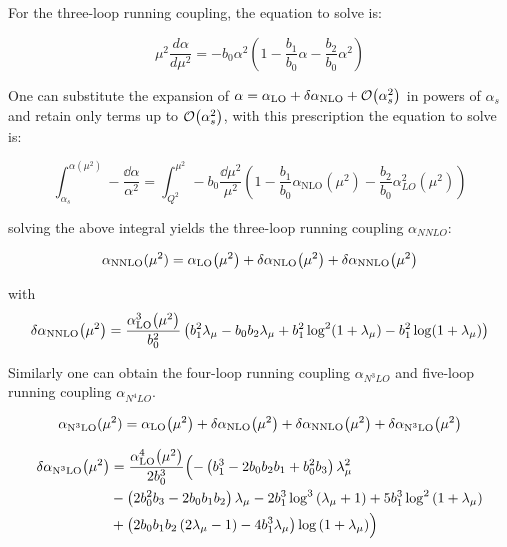 \documentclass[../main.tex]{subfiles}
\begin{document}
For the three-loop running coupling, the equation to solve is:

\begin{equation}
    \mu^2 \frac{d\alpha}{d\mu^2} = - b_0 \alpha^2(1 - \frac{b_1}{b_0} \alpha - \frac{b_2}{b_0} \alpha^2)
\end{equation}

One can substitute the expansion of $\alpha= \alpha_{\text{LO}}+\delta\alpha_{\text{NLO}}+\order{\alpha_s^2}$ in powers of $\alpha_s$ 
and retain only terms up to $\order{\alpha_s^2}$, with this prescription the equation to solve is:

\begin{equation}
    \int_{\alpha_s}^{\alpha(\mu^2)} -\frac{\dd\alpha}{\alpha^2} = 
    \int _{Q^2}^{\mu^2} - b_0 \frac{ \dd\mu^2}{\mu^2} ( 1 - \frac{b_1}{b_0} \alpha_{\text{NLO}}(\mu^2) - \frac{b_2}{b_0} \alpha_{LO}^2(\mu^2) )
\end{equation}

solving the above integral yields the three-loop running coupling $\alpha_{NNLO}$:

\begin{equation}\label{eq:NNLO}
    \alpha_{\text{NNLO}}(\mu^2) = \alpha_{\text{LO}}\qty(\mu^2) + \delta\alpha_{\text{NLO}}\qty(\mu^2)+\delta\alpha_{\text{NNLO}}\qty(\mu^2)
\end{equation}

with 
\begin{equation}\label{eq:DNNLO}
    \delta\alpha_{\text{NNLO}}\qty(\mu^2) = \frac{\alpha_{\text{LO}}^3\qty(\mu^2)}{b_0^2}\left(b _1^2 \lambda_\mu -b_0 b_2 \lambda_\mu +b_1^2 \log ^2(1+\lambda_\mu )-b_1^2 \log (1+\lambda_\mu )\right)    
\end{equation}

Similarly one can obtain the four-loop running coupling $\alpha_{N^3LO}$ and five-loop running coupling $\alpha_{N^4LO}$.

\begin{equation}\label{eq:N3LO}
    \alpha_{\text{N}^3\text{LO}}(\mu^2) = \alpha_{\text{LO}}\qty(\mu^2) + \delta\alpha_{\text{NLO}}\qty(\mu^2)+\delta\alpha_{\text{NNLO}}\qty(\mu^2)+\delta\alpha_{\text{N}^3\text{LO}}\qty(\mu^2)
\end{equation}

\begin{equation}\label{eq:DN3LO}
    \begin{split}
        \delta\alpha_{\text{N}^3\text{LO}}\qty(\mu^2) &= \frac{\alpha_{\text{LO}}^4\qty(\mu^2)}{2 b_0^3} \Bigl(-\left(b_1^3-2 b_0 b_2 b_1+b_0^2 b_3\right) \lambda _{\mu }^2\\
        &-\left(2 b_0^2 b_3-2 b_0 b_1 b_2\right) \lambda _{\mu }-2 b_1^3 \log ^3\left(\lambda _{\mu }+1\right)+5 b_1^3 \log ^2\left(1+\lambda _{\mu }\right)\\
        &+\left(2 b_0 b_1 b_2 \left(2 \lambda _{\mu }-1\right)-4 b_1^3 \lambda _{\mu }\right) \log \left(1+\lambda _{\mu }\right)\Bigr)
    \end{split}
\end{equation}
\end{document}
